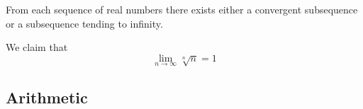     \begin{corollary}
      \label{existence}
      From each sequence of real numbers there exists either a convergent subsequence or a subsequence tending to infinity. 
    \end{corollary}

    \begin{example}
      We claim that
      \begin{equation}
        \lim_{n\rightarrow \infty} \sqrt[n]{n} = 1
      \end{equation}
    \end{example}

\subsection{Arithmetic}

